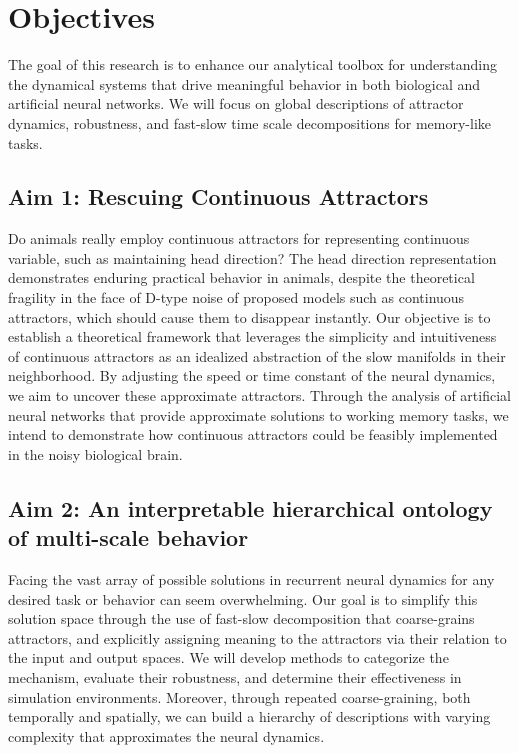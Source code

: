 \documentclass[12pt,letterpaper, onecolumn]{article}
\theoremstyle{definition}
\theoremstyle{remark}
\begin{document}
%


\newpage
\section{Objectives}

The goal of this research is to enhance our analytical toolbox for understanding the dynamical systems that drive meaningful behavior in both biological and artificial neural networks.
We will focus on global descriptions of attractor dynamics, robustness, and fast-slow time scale decompositions for memory-like tasks.

\subsection*{Aim 1: Rescuing Continuous Attractors}
Do animals really employ continuous attractors for representing continuous variable, such as maintaining head direction?
The head direction representation demonstrates enduring practical behavior in animals, despite the theoretical fragility in the face of D-type noise of proposed models such as continuous attractors, which should cause them to disappear instantly.
Our objective is to establish a theoretical framework that leverages the simplicity and intuitiveness of continuous attractors as an idealized abstraction of the slow manifolds in their neighborhood.
By adjusting the speed or time constant of the neural dynamics, we aim to uncover these approximate attractors.
Through the analysis of artificial neural networks that provide approximate solutions to working memory tasks, we intend to demonstrate how continuous attractors could be feasibly implemented in the noisy biological brain.

\subsection*{Aim 2: An interpretable hierarchical ontology of multi-scale behavior}
Facing the vast array of possible solutions in recurrent neural dynamics for any desired task or behavior can seem overwhelming.
Our goal is to simplify this solution space through the use of fast-slow decomposition that coarse-grains attractors, and explicitly assigning meaning to the attractors via their relation to the input and output spaces.
We will develop methods to categorize the mechanism, evaluate their robustness, and determine their effectiveness in simulation environments.
Moreover, through repeated coarse-graining, both temporally and spatially, we can build a hierarchy of descriptions with varying complexity that approximates the neural dynamics.
\end{document}
